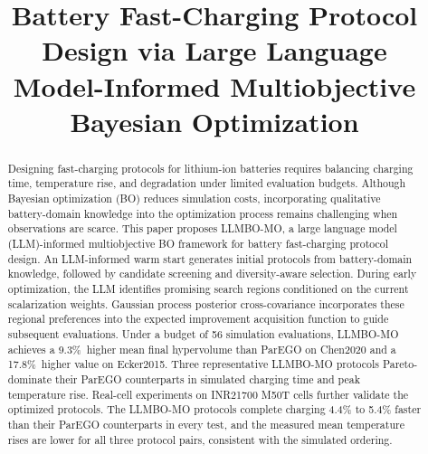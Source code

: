 \documentclass[lettersize,journal]{IEEEtran}
\newcommand{\ChenFinalGain}{9.3\%}
\newcommand{\EckerFinalGain}{17.8\%}
\begin{document}
\title{{\fontsize{21pt}{27pt}\selectfont
Battery Fast-Charging Protocol Design via Large Language\\
Model-Informed Multiobjective Bayesian Optimization}}

\author{}

\maketitle

\begin{abstract}
Designing fast-charging protocols for lithium-ion batteries
requires balancing charging time, temperature rise, and
degradation under limited evaluation budgets. Although
Bayesian optimization (BO) reduces simulation costs,
incorporating qualitative battery-domain knowledge into
the optimization process remains challenging when
observations are scarce. This paper proposes LLMBO-MO,
a large language model (LLM)-informed multiobjective BO
framework for battery fast-charging protocol design.
An LLM-informed warm start generates initial protocols
from battery-domain knowledge, followed by candidate
screening and diversity-aware selection. During early
optimization, the LLM identifies promising search regions
conditioned on the current scalarization weights.
Gaussian process posterior cross-covariance incorporates
these regional preferences into the expected improvement
acquisition function to guide subsequent evaluations.
Under a budget of 56 simulation evaluations, LLMBO-MO
achieves a \ChenFinalGain\ higher mean final hypervolume
than ParEGO on Chen2020 and a \EckerFinalGain\ higher
value on Ecker2015. Three representative LLMBO-MO protocols
Pareto-dominate their ParEGO counterparts in simulated
charging time and peak temperature rise. Real-cell
experiments on INR21700 M50T cells further validate the
optimized protocols. The LLMBO-MO protocols complete
charging 4.4\% to 5.4\% faster than their ParEGO
counterparts in every test, and the measured mean
temperature rises are lower for all three protocol pairs,
consistent with the simulated ordering.
\end{abstract}
\end{document}
